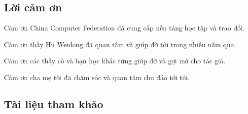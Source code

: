 \documentclass[11pt]{article}
\begin{document}
\subsection*{Lời cảm ơn}

Cảm ơn China Computer Federation đã cung cấp nền tảng học tập và trao đổi.

Cảm ơn thầy Hu Weidong đã quan tâm và giúp đỡ tôi trong nhiều năm qua.

Cảm ơn các thầy cô và bạn học khác từng giúp đỡ và gợi mở cho tác giả.

Cảm ơn cha mẹ tôi đã chăm sóc và quan tâm chu đáo tới tôi.

\subsection*{Tài liệu tham khảo}
\end{document}
